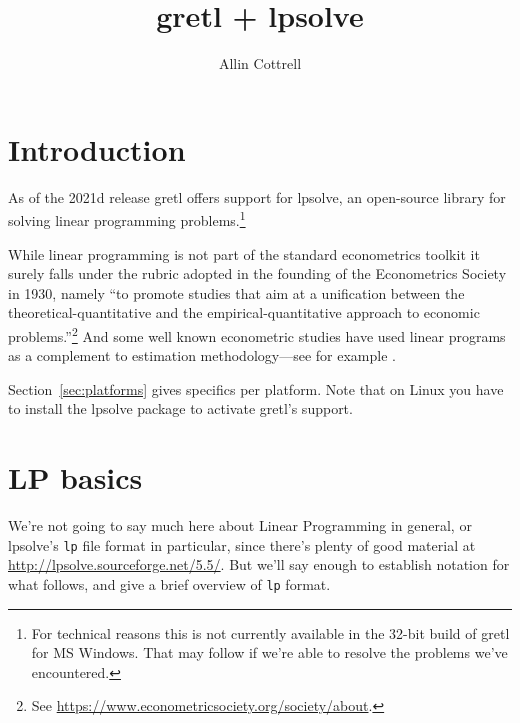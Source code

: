 \documentclass{article}
\begin{document}
\setlength{\parindent}{0pt}
\setlength{\parskip}{1ex}
\setcounter{secnumdepth}{1}

\newenvironment{funcdoc}
{\noindent\hrulefill\\[-10pt]}
{\medskip}

\newcommand{\argname}[1]{\textsl{#1}}

\title{gretl + lpsolve}
\author{Allin Cottrell}
\maketitle

\section{Introduction}
\label{sec:intro}

As of the 2021d release gretl offers support for \textsf{lpsolve}, an
open-source library for solving linear programming
problems.\footnote{For technical reasons this is not currently
  available in the 32-bit build of gretl for MS Windows. That may
  follow if we're able to resolve the problems we've encountered.}

While linear programming is not part of the standard econometrics
toolkit it surely falls under the rubric adopted in the founding of
the Econometrics Society in 1930, namely ``to promote studies that aim
at a unification between the theoretical-quantitative and the
empirical-quantitative approach to economic problems.''\footnote{See
  \url{https://www.econometricsociety.org/society/about}.} And
some well known econometric studies have used linear programs as a
complement to estimation methodology---see for example
\cite{ferrier-lovell90}.

Section~\ref{sec:platforms} gives specifics per platform. Note that on
Linux you have to install the \textsf{lpsolve} package to activate
gretl's support.

\section{LP basics}
\label{sec:basics}

We're not going to say much here about Linear Programming in general,
or \textsf{lpsolve}'s \texttt{lp} file format in particular, since
there's plenty of good material at
\url{http://lpsolve.sourceforge.net/5.5/}. But we'll say enough to
establish notation for what follows, and give a brief overview of
\texttt{lp} format.
\end{document}
